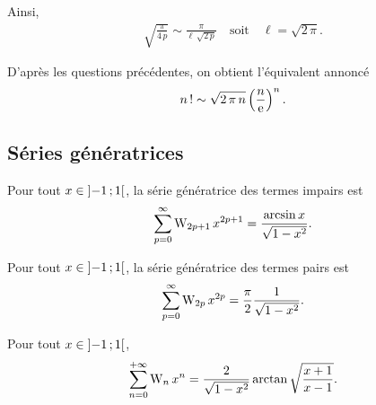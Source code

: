 \begin{solution}
\begin{reponses}
Ainsi,
\begin{align*}
\sqrt{\frac{\pi}{4 \, p}} \sim \frac{\pi}{\ell \, \sqrt{2 \, p}}
\quad \text{soit} \quad 
\ell = \sqrt{2 \, \pi}.
\end{align*}

\item D'après les questions précédentes, on obtient l'équivalent annoncé
\[
n\,! \sim \sqrt{2 \, \pi \, n} \left(\frac{n}{\mathrm{e}}\right)^n.
\]
\end{reponses}
\end{solution}

\subsection{Séries génératrices}


\begin{prop}
Pour tout $x \in \left]-1\,;1\right[$, la série génératrice des termes impairs est
$$\sum_{p=0}^\infty \mathrm{W}_{2p+1} \, x^{2p+1} = \frac{\arcsin x}{\sqrt{1-x^2}}.$$

Pour tout $x \in \left]-1\,;1\right[$, la série génératrice des termes pairs est 
$$\sum_{p=0}^\infty \mathrm{W}_{2p} \, x^{2p} = \frac{\pi}{2} \frac{1}{\sqrt{1-x^2}}.$$

Pour tout $x \in \left]-1\,;1\right[$,
\[
\sum_{n=0}^{+\infty} \mathrm{W}_n \, x^n = \frac{2}{\sqrt{1 - x^2}} \arctan\sqrt{\frac{x + 1}{x - 1}}.
\]
\end{prop}


